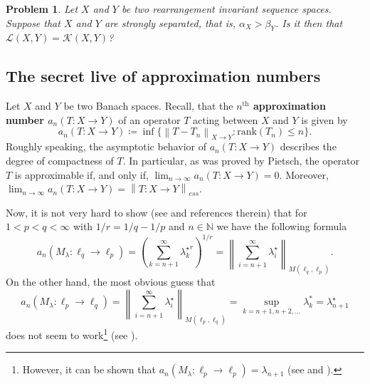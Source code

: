 \documentclass[11pt]{amsart}
\theoremstyle{definition}
\theoremstyle{definition}
\theoremstyle{definition}
\theoremstyle{definition}
\theoremstyle{definition}
\theoremstyle{definition}
\theoremstyle{definition}
\theoremstyle{definition}
\numberwithin{equation}{section}
\numberwithin{equation}{section}
\numberwithin{equation}{section}
\theoremstyle{definition}
\theoremstyle{definition}
\theoremstyle{definition}
\theoremstyle{definition}
\theoremstyle{definition}
\theoremstyle{definition}
\newtheorem{problem}[theorem]{Problem}
\newcommand{\norm}[1]{\left\lVert#1\right\rVert}
\begin{document}
\begin{problem}
	{\it Let $X$ and $Y$ be two rearrangement invariant sequence spaces.
	Suppose that $X$ and $Y$ are strongly separated, that is, $\alpha_X > \beta_Y$.
	Is it then that $\mathscr{L}(X,Y) = \mathscr{K}(X,Y)$?}
\end{problem}

\subsection{The secret live of approximation numbers}

	Let $X$ and $Y$ be two Banach spaces. Recall, that the {\bf $n^{\text{th}}$ approximation number $a_n(T \colon X \rightarrow Y)$}
	of an operator $T$ acting between $X$ and $Y$ is given by
	\begin{equation*}
		a_n(T \colon X \rightarrow Y) \coloneqq \inf \Big\{ \norm{T - T_n}_{X \rightarrow Y} \colon \text{rank}(T_n) \leqslant n \Big\}.
	\end{equation*}
	Roughly speaking, the asymptotic behavior of $a_n(T \colon X \rightarrow Y)$ describes the degree of compactness of $T$.
	In particular, as was proved by Pietsch, the operator $T$ is approximable if, and only if, $\lim_{n \rightarrow \infty} a_n(T \colon X \rightarrow Y) = 0$.
	Moreover, $\lim_{n \rightarrow \infty} a_n(T \colon X \rightarrow Y) = \norm{T \colon X \rightarrow Y}_{ess}$.

	Now, it is not very hard to show (see \cite[Theorem~2.6]{HMR76} and references therein) that for $1 < p < q < \infty$ with $1/r = 1/q - 1/p$
	and $n \in \mathbb{N}$ we have the following formula
	\begin{equation*}
		a_n(M_{\lambda} \colon \ell_q \rightarrow \ell_p)
			= \left( \sum_{k=n+1}^{\infty} {\lambda_k^{\star}}^r \right)^{1/r}
			= \norm{ \sum_{i=n+1}^{\infty} \lambda^{\star}_i }_{M(\ell_q,\ell_p)}.
	\end{equation*}
	On the other hand, the most obvious guess that
	\begin{equation*}
		a_n(M_{\lambda} \colon \ell_p \rightarrow \ell_q)
			= \norm{ \sum_{i=n+1}^{\infty} \lambda^{\star}_i }_{M(\ell_p,\ell_q)}
			= \sup_{k = n+1, n+2, ...} \lambda_k^*
			= \lambda_{n+1}^{\star}
	\end{equation*}
	does not seem to work\footnote{However, it can be shown that $a_n(M_{\lambda} \colon \ell_p \rightarrow \ell_p) = \lambda_{n+1}$ (see \cite[Theorem~7.1]{Pie74} and \cite[p.~58]{HMR76}).}
	(see \cite[Example~2.13]{HMR76}).
	
\end{document}
